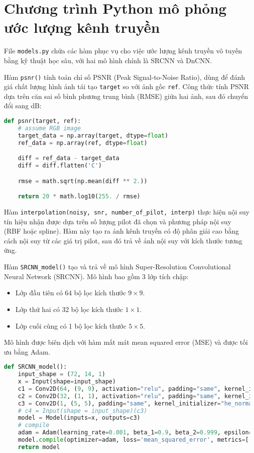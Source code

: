 \section{Chương trình Python mô phỏng ước lượng kênh truyền}

File \verb|models.py| chứa các hàm phục vụ cho việc ước lượng kênh truyền vô tuyến bằng kỹ thuật học sâu, với hai mô hình chính là SRCNN và DnCNN.

Hàm \verb|psnr()| tính toán chỉ số PSNR (Peak Signal-to-Noise Ratio), 
dùng để đánh giá chất lượng hình ảnh tái tạo \verb|target| so với ảnh gốc \verb|ref|.
Công thức tính PSNR dựa trên căn sai số bình phương trung bình (RMSE) giữa hai ảnh, sau đó chuyển đổi sang dB:

\begin{lstlisting}[language=Python]
def psnr(target, ref):
    # assume RGB image
    target_data = np.array(target, dtype=float)
    ref_data = np.array(ref, dtype=float)

    diff = ref_data - target_data
    diff = diff.flatten('C')

    rmse = math.sqrt(np.mean(diff ** 2.))

    return 20 * math.log10(255. / rmse)
\end{lstlisting}

Hàm \verb|interpolation(noisy, snr, number_of_pilot, interp)| thực hiện nội suy tín hiệu nhận được dựa trên số lượng pilot đã chọn và phương pháp nội suy (RBF hoặc spline).
Hàm này tạo ra ảnh kênh truyền có độ phân giải cao bằng cách nội suy từ các giá trị pilot, sau đó trả về ảnh nội suy với kích thước tương ứng.

Hàm \verb|SRCNN_model()| tạo và trả về mô hình Super-Resolution Convolutional Neural Network (SRCNN). Mô hình bao gồm 3 lớp tích chập:
\begin{itemize}
    \item Lớp đầu tiên có 64 bộ lọc kích thước $9 \times 9$.
    \item Lớp thứ hai có 32 bộ lọc kích thước $1 \times 1$.
    \item Lớp cuối cùng có 1 bộ lọc kích thước $5 \times 5$.
\end{itemize}

Mô hình được biên dịch với hàm mất mát mean squared error (MSE) và được tối ưu bằng Adam.

\begin{lstlisting}[language=Python]
def SRCNN_model():
    input_shape = (72, 14, 1)
    x = Input(shape=input_shape)
    c1 = Conv2D(64, (9, 9), activation="relu", padding="same", kernel_initializer="he_normal")(x)
    c2 = Conv2D(32, (1, 1), activation="relu", padding="same", kernel_initializer="he_normal")(c1)
    c3 = Conv2D(1, (5, 5), padding="same", kernel_initializer="he_normal")(c2)
    # c4 = Input(shape = input_shape)(c3)
    model = Model(inputs=x, outputs=c3)
    # compile
    adam = Adam(learning_rate=0.001, beta_1=0.9, beta_2=0.999, epsilon=1e-8)
    model.compile(optimizer=adam, loss='mean_squared_error', metrics=['mean_squared_error'])
    return model
\end{lstlisting}

